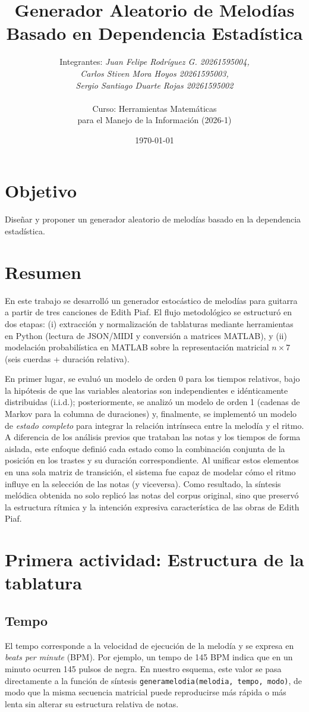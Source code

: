 \documentclass{article}
\title{Generador Aleatorio de Melodías Basado en Dependencia Estadística}
\author{Integrantes: 
    \textit{Juan Felipe Rodríguez G. 20261595004,} \\ 
    \textit{Carlos Stiven Mora Hoyos 20261595003,} \\ 
    \textit{Sergio Santiago Duarte Rojas 20261595002} \\
    \\Curso: Herramientas Matemáticas \\para el Manejo de la Información (2026-1)}
\date{\today}
\theoremstyle{plain}
\theoremstyle{definition}
\begin{document}
\maketitle

\section*{Objetivo}
Diseñar y proponer un generador aleatorio de melodías basado en la dependencia estadística.

\section*{Resumen}
En este trabajo se desarrolló un generador estocástico de melodías para guitarra a partir de tres canciones de Edith Piaf. El flujo metodológico se estructuró en dos etapas: (i) extracción y normalización de tablaturas mediante herramientas en Python (lectura de JSON/MIDI y conversión a matrices MATLAB), y (ii) modelación probabilística en MATLAB sobre la representación matricial $n \times 7$ (seis cuerdas + duración relativa).

En primer lugar, se evaluó un modelo de orden 0 para los tiempos relativos, bajo la hipótesis de que las variables aleatorias son independientes e idénticamente distribuidas (i.i.d.); posteriormente, se analizó un modelo de orden 1 (cadenas de Markov para la columna de duraciones) y, finalmente, se implementó un modelo de \textit{estado completo} para integrar la relación intrínseca entre la melodía y el ritmo. A diferencia de los análisis previos que trataban las notas y los tiempos de forma aislada, este enfoque definió cada estado como la combinación conjunta de la posición en los trastes y su duración correspondiente. Al unificar estos elementos en una sola matriz de transición, el sistema fue capaz de modelar cómo el ritmo influye en la selección de las notas (y viceversa). Como resultado, la síntesis melódica obtenida no solo replicó las notas del corpus original, sino que preservó la estructura rítmica y la intención expresiva característica de las obras de Edith Piaf.

\section*{Primera actividad: Estructura de la tablatura}
\subsection*{Tempo}
El tempo corresponde a la velocidad de ejecución de la melodía y se expresa en \textit{beats per minute} (BPM). Por ejemplo, un tempo de 145 BPM indica que en un minuto ocurren 145 pulsos de negra. En nuestro esquema, este valor se pasa directamente a la función de síntesis \texttt{generamelodia(melodia, tempo, modo)}, de modo que la misma secuencia matricial puede reproducirse más rápida o más lenta sin alterar su estructura relativa de notas.
\end{document}
